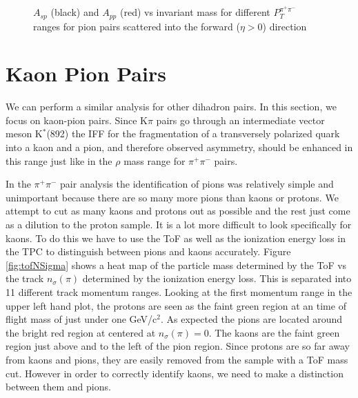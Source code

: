 \documentclass[abstract = on,listof=totoc, bibliography=totoc]{scrreprt}
\newcommand{\ptpair}{P_{T}^{\pi^+\pi^-}}
\newcommand{\pip}{\pi^+}
\newcommand{\pim}{\pi^-}
\newcommand{\pair}{$\pip\pim$ }
\newcommand{\nsigpi}{n_\sigma(\pi)}
\begin{document}
\begin{figure}
\begin{tabular}{cc}
\end{tabular}
\caption{$A_{sp}$ (black) and $A_{pp}$ (red) vs invariant mass for different $\ptpair$ ranges for pion pairs scattered into the forward ($\eta > 0$) direction}
\label{fig:partWaveFits}
\end{figure}






\section{Kaon Pion Pairs}

We can perform a similar analysis for other dihadron pairs. In this section, we focus on kaon-pion pairs. Since K$\pi$ pairs go through an intermediate vector meson K$^*$(892) the IFF for the fragmentation of a transversely polarized quark into a kaon and a pion, and therefore observed asymmetry, should be enhanced in this range just like in the $\rho$ mass range for \pair pairs\cite{PhysRevLett.80.1166}. 

In the \pair pair analysis the identification of pions was relatively simple and unimportant because there are so many more pions than kaons or protons. We attempt to cut as many kaons and protons out as possible and the rest just come as a dilution to the proton sample. It is a lot more difficult to look specifically for kaons. To do this we have to use the ToF as well as the ionization energy loss in the TPC to distinguish between pions and kaons accurately. Figure \ref{fig:tofNSigma} shows a heat map of the particle mass determined by the ToF vs the track $\nsigpi$ determined by the ionization energy loss. This is separated into 11 different track momentum ranges. Looking at the first momentum range in the upper left hand plot, the protons are seen as the faint green region at an time of flight mass of just under one GeV/c$^2$. As expected the pions are located around the bright red region at centered at $\nsigpi = 0$. The kaons are the faint green region just above and to the left of the pion region. Since protons are so far away from kaons and pions, they are easily removed from the sample with a ToF mass cut. However in order to correctly identify kaons, we need to make a distinction between them and pions. 
\end{document}
